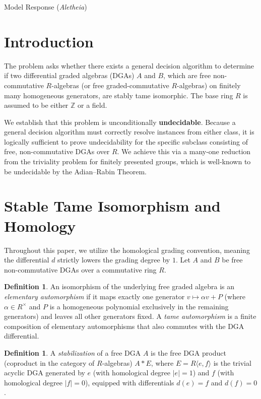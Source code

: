 \documentclass{article}
\theoremstyle{plain}
\theoremstyle{definition}
\newtheorem{definition}[theorem]{Definition}
\newcommand{\Aletheia}{\emph{Aletheia}}
\begin{document}
\begin{solution}{Model Response (\Aletheia)}
\section{Introduction}

The problem asks whether there exists a general decision algorithm to determine if two differential graded algebras (DGAs) $A$ and $B$, which are free non-commutative $R$-algebras (or free graded-commutative $R$-algebras) on finitely many homogeneous generators, are stably tame isomorphic. The base ring $R$ is assumed to be either $\mathbb{Z}$ or a field.

We establish that this problem is unconditionally \textbf{undecidable}. Because a general decision algorithm must correctly resolve instances from either class, it is logically sufficient to prove undecidability for the specific subclass consisting of free, non-commutative DGAs over $R$. We achieve this via a many-one reduction from the triviality problem for finitely presented groups, which is well-known to be undecidable by the Adian--Rabin Theorem.

\section{Stable Tame Isomorphism and Homology}

Throughout this paper, we utilize the homological grading convention, meaning the differential $d$ strictly lowers the grading degree by $1$. Let $A$ and $B$ be free non-commutative DGAs over a commutative ring $R$.

\begin{definition}
An isomorphism of the underlying free graded algebra is an \emph{elementary automorphism} if it maps exactly one generator $v \mapsto \alpha v + P$ (where $\alpha \in R^\times$ and $P$ is a homogeneous polynomial exclusively in the remaining generators) and leaves all other generators fixed. A \emph{tame automorphism} is a finite composition of elementary automorphisms that also commutes with the DGA differential.
\end{definition}

\begin{definition}
A \emph{stabilization} of a free DGA $A$ is the free DGA product (coproduct in the category of $R$-algebras) $A * E$, where $E = R\langle e, f \rangle$ is the trivial acyclic DGA generated by $e$ (with homological degree $|e| = 1$) and $f$ (with homological degree $|f| = 0$), equipped with differentials $d(e) = f$ and $d(f) = 0$.
\end{definition}


\end{solution}
\end{document}

